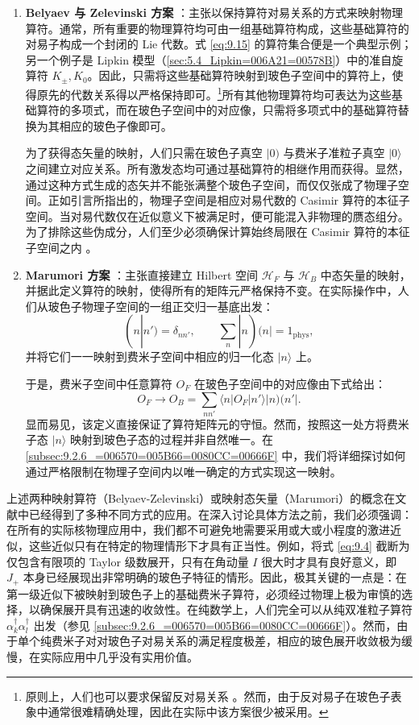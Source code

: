 \begin{enumerate}
\item \textbf{Belyaev 与 Zelevinski 方案} \cite{BZ62}：主张以保持算符对易关系的方式来映射物理算符。通常，所有重要的物理算符均可由一组基础算符构成，这些基础算符的对易子构成一个封闭的
Lie 代数。式 \ref{eq:9.15} 的算符集合便是一个典型示例；另一个例子是 Lipkin 模型（\ref{sec:5.4_Lipkin=006A21=00578B}）中的准自旋算符
$K_{\pm},K_{0}$。因此，只需将这些基础算符映射到玻色子空间中的算符上，使得原先的代数关系得以严格保持即可。\footnote{原则上，人们也可以要求保留反对易关系 \cite{Am65,DK75}。然而，由于反对易子在玻色子表象中通常很难精确处理，因此在实际中该方案很少被采用。}所有其他物理算符均可表达为这些基础算符的多项式，而在玻色子空间中的对应像，只需将多项式中的基础算符替换为其相应的玻色子像即可。

为了获得态矢量的映射，人们只需在玻色子真空 $|0)$ 与费米子准粒子真空 $|0\rangle$ 之间建立对应关系。所有激发态均可通过基础算符的相继作用而获得。显然，通过这种方式生成的态矢并不能张满整个玻色子空间，而仅仅张成了物理子空间。正如引言所指出的，物理子空间是相应对易代数的
Casimir 算符的本征子空间。当对易代数仅在近似意义下被满足时，便可能混入非物理的赝态组分。为了排除这些伪成分，人们至少必须确保计算始终局限在
Casimir 算符的本征子空间之内 \cite{Ya74}。
\item \textbf{Marumori 方案} \cite{MYT64a,MYT64b}：主张直接建立 Hilbert 空间 $\mathcal{H}_{F}$
与 $\mathcal{H}_{B}$ 中态矢量的映射，并据此定义算符的映射，使得所有的矩阵元严格保持不变。在实际操作中，人们从玻色子物理子空间的一组正交归一基底出发：
\[
(n|n')=\delta_{nn'},\qquad\sum_{n}|n)(n|=1_{\text{phys}},
\]
并将它们一一映射到费米子空间中相应的归一化态 $|n\rangle$ 上。

于是，费米子空间中任意算符 $O_{F}$ 在玻色子空间中的对应像由下式给出：
\begin{equation}
O_{F}\to O_{B}=\sum_{nn'}\langle n|O_{F}|n'\rangle|n)(n'|.\label{eq:9.18}
\end{equation}
显而易见，该定义直接保证了算符矩阵元的守恒。然而，按照这一处方将费米子态 $|n\rangle$ 映射到玻色子态的过程并非自然唯一。在
\ref{subsec:9.2.6_=006570=005B66=0080CC=00666F} 中，我们将详细探讨如何通过严格限制在物理子空间内以唯一确定的方式实现这一映射。
\end{enumerate}
上述两种映射算符（Belyaev-Zelevinski）或映射态矢量（Marumori）的概念在文献中已经得到了多种不同方式的应用。在深入讨论具体方法之前，我们必须强调：在所有的实际核物理应用中，我们都不可避免地需要采用或大或小程度的激进近似，这些近似只有在特定的物理情形下才具有正当性。例如，将式
\ref{eq:9.4} 截断为仅包含有限项的 Taylor 级数展开，只有在角动量 $I$ 很大时才具有良好意义，即 $J_{+}$
本身已经展现出非常明确的玻色子特征的情形。因此，极其关键的一点是：在第一级近似下被映射到玻色子上的基础费米子算符，必须经过物理上极为审慎的选择，以确保展开具有迅速的收敛性。在纯数学上，人们完全可以从纯双准粒子算符
$\alpha^{\dagger}_{k}\alpha^{\dagger}_{l}$ 出发（参见 \ref{subsec:9.2.6_=006570=005B66=0080CC=00666F}）。然而，由于单个纯费米子对对玻色子对易关系的满足程度极差，相应的玻色展开收敛极为缓慢，在实际应用中几乎没有实用价值。

